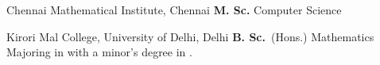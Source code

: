 {%
	Chennai Mathematical Institute, Chennai}
{%
	\textbf{M. Sc.} Computer Science}
{%
}

{%
	Kirori Mal College, University of Delhi, Delhi}
{%
	\textbf{B. Sc.}~(Hons.) Mathematics}
{%
	Majoring in  with a minor's degree in .
}

